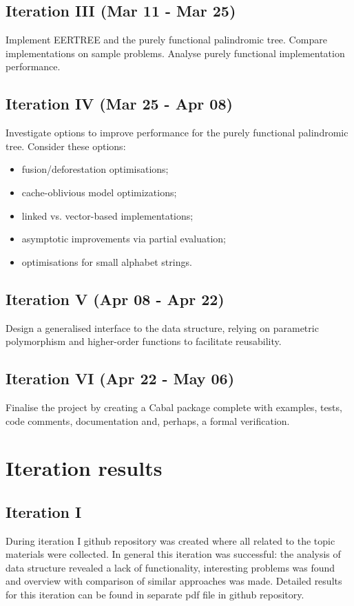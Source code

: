\subsection{Iteration III (Mar 11 - Mar 25)}

Implement EERTREE and the purely functional palindromic tree.
Compare implementations on sample problems.
Analyse purely functional implementation performance.

\subsection{Iteration IV (Mar 25 - Apr 08)}

Investigate options to improve performance for
the purely functional palindromic tree.
Consider these options:

\begin{itemize}
  \item fusion/deforestation optimisations;
  \item cache-oblivious model optimizations;
  \item linked vs. vector-based implementations;
  \item asymptotic improvements via partial evaluation;
  \item optimisations for small alphabet strings.
\end{itemize}

\subsection{Iteration V (Apr 08 - Apr 22)}

Design a generalised interface to the data structure,
relying on parametric polymorphism and higher-order functions
to facilitate reusability.

\subsection{Iteration VI (Apr 22 - May 06)}

Finalise the project by creating a Cabal package complete with
examples, tests, code comments, documentation and, perhaps, a
formal verification.

\section{Iteration results}

\subsection{Iteration I}
During iteration I github repository\cite{khazhix} was created where all related to the topic materials were collected. In general this iteration was successful: the analysis of data structure revealed a lack of functionality, interesting problems was found and overview with comparison of similar approaches was made. Detailed results for this iteration can be found in separate pdf file\cite{khazhix1} in github repository.